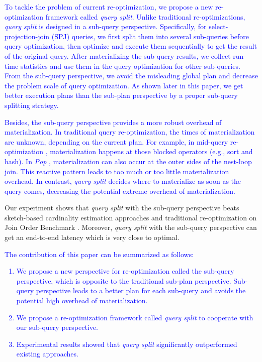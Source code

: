 \textcolor{blue}{
    To tackle the problem of current re-optimization, we propose a new re-optimization framework called \textit{query split}. Unlike traditional re-optimizations, \textit{query split} is designed in a sub-query perspective. Specifically, for select-projection-join (SPJ) queries, we first split them into several sub-queries before query optimization, then optimize and execute them sequentially to get the result of the original query. After materializing the sub-query results, we collect run-time statistics and use them in the query optimization for other sub-queries. From the sub-query perspective, we avoid the misleading global plan and decrease the problem scale of query optimization. As shown later in this paper, we get better execution plans than the sub-plan perspective by a proper sub-query splitting strategy.
}\par
\textcolor{blue}{
    Besides, the sub-query perspective provides a more robust overhead of materialization. In traditional query re-optimization, the times of materialization are unknown, depending on the current plan. For example, in mid-query re-optimization \cite{Reopt}, materialization happens at those blocked operators (e.g., sort and hash). In \textit{Pop} \cite{Pop}, materialization can also occur at the outer sides of the nest-loop join. This reactive pattern leads to too much or too little materialization overhead. In contrast, \textit{query split} decides where to materialize as soon as the query comes, decreasing the potential extreme overhead of materialization.
}\par
    Our experiment shows that \textit{query split} with the sub-query perspective beats sketch-based cardinality estimation approaches and traditional re-optimization on Join Order Benchmark \cite{JOB}. Moreover, \textit{query split} with the sub-query perspective can get an end-to-end latency which is very close to optimal.\par
\textcolor{blue}{
    The contribution of this paper can be summarized as follows:
    \begin{enumerate}[leftmargin = 15pt]
        \item We propose a new perspective for re-optimization called the sub-query perspective, which is opposite to the traditional sub-plan perspective. Sub-query perspective leads to a better plan for each sub-query and avoids the potential high overhead of materialization.
        \item We propose a re-optimization framework called \textit{query split} to cooperate with our sub-query perspective.
        \item Experimental results showed that \textit{query split} significantly outperformed existing approaches.
    \end{enumerate}
}\par
